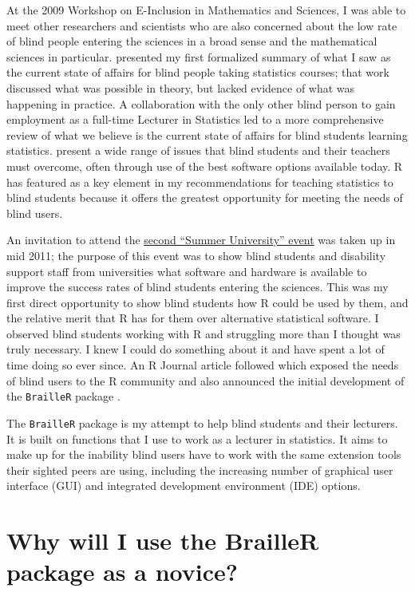 \documentclass[
]{book}
\begin{document}
At the 2009 Workshop on E-Inclusion in Mathematics and Sciences, I was able to meet other researchers and scientists who are also concerned about the low rate of blind people entering the sciences in a broad sense and the mathematical sciences in particular. \citep{Godfrey2009AccessiblePaper} presented my first formalized summary of what I saw as the current state of affairs for blind people taking statistics courses; that work discussed what was possible in theory, but lacked evidence of what was happening in practice.
A collaboration with the only other blind person to gain employment as a full-time Lecturer in Statistics led to a more comprehensive review of what we believe is the current state of affairs for blind students learning statistics. \citep{GodfreyLoots-JSE} present a wide range of issues that blind students and their teachers must overcome, often through use of the best software options available today. R \citep{Rpkg-base} has featured as a key element in my recommendations for teaching statistics to blind students \citep{Godfrey2009AccessiblePaper} because it offers the greatest opportunity for meeting the needs of blind users.

An invitation to attend the \href{http://icchp-su.net/}{second ``Summer University'' event} was taken up in mid 2011; the purpose of this event was to show blind students and disability support staff from universities what software and hardware is available to improve the success rates of blind students entering the sciences.
This was my first direct opportunity to show blind students how R could be used by them, and the relative merit that R has for them over alternative statistical software.
I observed blind students working with R and struggling more than I thought was truly necessary. I knew I could do something about it and have spent a lot of time doing so ever since.
An R Journal article \citep{GodfreyRJournal} followed which exposed the needs of blind users to the R community and also announced the initial development of the \texttt{BrailleR} package \citep{Rpkg-BrailleR}.

The \texttt{BrailleR} package is my attempt to help blind students and their lecturers. It is built on functions that I use to work as a lecturer in statistics. It aims to make up for the inability blind users have to work with the same extension tools their sighted peers are using, including the increasing number of graphical user interface (GUI) and integrated development environment (IDE) options.

\hypertarget{why-will-i-use-the-brailler-package-as-a-novice}{%
\section{Why will I use the BrailleR package as a novice?}\label{why-will-i-use-the-brailler-package-as-a-novice}}
\end{document}
